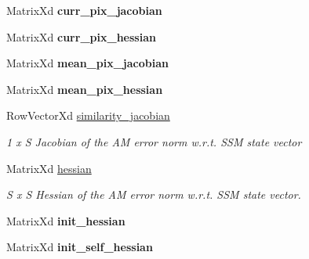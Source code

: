 \begin{DoxyCompactItemize}
\item 
\hypertarget{classDiagnostics_aa0d81d679032bd5ec54504806c3b3b65}{Matrix\-Xd {\bfseries curr\-\_\-pix\-\_\-jacobian}}\label{classDiagnostics_aa0d81d679032bd5ec54504806c3b3b65}

\item 
\hypertarget{classDiagnostics_a93756de17709a056f143941c9c9633c1}{Matrix\-Xd {\bfseries curr\-\_\-pix\-\_\-hessian}}\label{classDiagnostics_a93756de17709a056f143941c9c9633c1}

\item 
\hypertarget{classDiagnostics_ae111d0a62eb53ff3d22b4e4244104da5}{Matrix\-Xd {\bfseries mean\-\_\-pix\-\_\-jacobian}}\label{classDiagnostics_ae111d0a62eb53ff3d22b4e4244104da5}

\item 
\hypertarget{classDiagnostics_a5d6ec9a29a3633af3191f8535258e63e}{Matrix\-Xd {\bfseries mean\-\_\-pix\-\_\-hessian}}\label{classDiagnostics_a5d6ec9a29a3633af3191f8535258e63e}

\item 
\hypertarget{classDiagnostics_a0c912c49fc34a709e92ef6567718c55c}{Row\-Vector\-Xd \hyperlink{classDiagnostics_a0c912c49fc34a709e92ef6567718c55c}{similarity\-\_\-jacobian}}\label{classDiagnostics_a0c912c49fc34a709e92ef6567718c55c}

\begin{DoxyCompactList}\small\item\em 1 x S Jacobian of the A\-M error norm w.\-r.\-t. S\-S\-M state vector \end{DoxyCompactList}\item 
\hypertarget{classDiagnostics_a7ed879e92b97e12309bb1e3600cf85d9}{Matrix\-Xd \hyperlink{classDiagnostics_a7ed879e92b97e12309bb1e3600cf85d9}{hessian}}\label{classDiagnostics_a7ed879e92b97e12309bb1e3600cf85d9}

\begin{DoxyCompactList}\small\item\em S x S Hessian of the A\-M error norm w.\-r.\-t. S\-S\-M state vector. \end{DoxyCompactList}\item 
\hypertarget{classDiagnostics_a81b44beee4337cf75dfb1a2a57435695}{Matrix\-Xd {\bfseries init\-\_\-hessian}}\label{classDiagnostics_a81b44beee4337cf75dfb1a2a57435695}

\item 
\hypertarget{classDiagnostics_aa514bd591c607d57586fff54867be0bc}{Matrix\-Xd {\bfseries init\-\_\-self\-\_\-hessian}}\label{classDiagnostics_aa514bd591c607d57586fff54867be0bc}


\end{DoxyCompactItemize}
